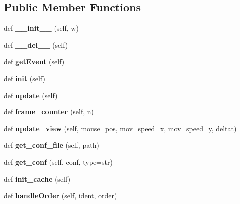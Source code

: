 \subsection*{Public Member Functions}
\begin{DoxyCompactItemize}
\item 
\hypertarget{classsrc_1_1pygamecli_1_1_client_a6fe4c8b8ffc16a1305b2d0f8991b0ffa}{}\label{classsrc_1_1pygamecli_1_1_client_a6fe4c8b8ffc16a1305b2d0f8991b0ffa} 
def {\bfseries \+\_\+\+\_\+init\+\_\+\+\_\+} (self, w)
\item 
\hypertarget{classsrc_1_1pygamecli_1_1_client_ac92efdae0937a1aab92800264b8ae9d5}{}\label{classsrc_1_1pygamecli_1_1_client_ac92efdae0937a1aab92800264b8ae9d5} 
def {\bfseries \+\_\+\+\_\+del\+\_\+\+\_\+} (self)
\item 
\hypertarget{classsrc_1_1pygamecli_1_1_client_a7fdce7b488332b6a9b2cfd6b658f84e7}{}\label{classsrc_1_1pygamecli_1_1_client_a7fdce7b488332b6a9b2cfd6b658f84e7} 
def {\bfseries get\+Event} (self)
\item 
\hypertarget{classsrc_1_1pygamecli_1_1_client_aef48aae8c93567a0924a5d6a2309da58}{}\label{classsrc_1_1pygamecli_1_1_client_aef48aae8c93567a0924a5d6a2309da58} 
def {\bfseries init} (self)
\item 
\hypertarget{classsrc_1_1pygamecli_1_1_client_ab9ebc09c61442ad4a44660ef8b762246}{}\label{classsrc_1_1pygamecli_1_1_client_ab9ebc09c61442ad4a44660ef8b762246} 
def {\bfseries update} (self)
\item 
\hypertarget{classsrc_1_1pygamecli_1_1_client_aed63a1cc434cba703729fbc1644b2e96}{}\label{classsrc_1_1pygamecli_1_1_client_aed63a1cc434cba703729fbc1644b2e96} 
def {\bfseries frame\+\_\+counter} (self, n)
\item 
\hypertarget{classsrc_1_1pygamecli_1_1_client_abdf36b75f4b29e4f2c74d3a6b5144e10}{}\label{classsrc_1_1pygamecli_1_1_client_abdf36b75f4b29e4f2c74d3a6b5144e10} 
def {\bfseries update\+\_\+view} (self, mouse\+\_\+pos, mov\+\_\+speed\+\_\+x, mov\+\_\+speed\+\_\+y, deltat)
\item 
\hypertarget{classsrc_1_1pygamecli_1_1_client_a83d8335f554e9bf57faba2e4ef53e6e9}{}\label{classsrc_1_1pygamecli_1_1_client_a83d8335f554e9bf57faba2e4ef53e6e9} 
def {\bfseries get\+\_\+conf\+\_\+file} (self, path)
\item 
\hypertarget{classsrc_1_1pygamecli_1_1_client_a50c4ff7e216329722138db8fbd37f198}{}\label{classsrc_1_1pygamecli_1_1_client_a50c4ff7e216329722138db8fbd37f198} 
def {\bfseries get\+\_\+conf} (self, conf, type=str)
\item 
\hypertarget{classsrc_1_1pygamecli_1_1_client_a98b0b9df5770463e16b247562d3f15bf}{}\label{classsrc_1_1pygamecli_1_1_client_a98b0b9df5770463e16b247562d3f15bf} 
def {\bfseries init\+\_\+cache} (self)
\item 
\hypertarget{classsrc_1_1pygamecli_1_1_client_a6916abb43b5c9bedeacaaa854f80a9d5}{}\label{classsrc_1_1pygamecli_1_1_client_a6916abb43b5c9bedeacaaa854f80a9d5} 
def {\bfseries handle\+Order} (self, ident, order)
\end{DoxyCompactItemize}
